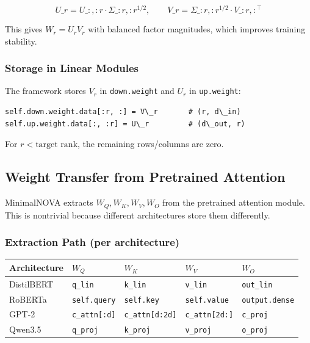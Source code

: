 \[
U\_r = U\_{:, :r} \cdot \Sigma\_{:r, :r}^{1/2}, \qquad
V\_r = \Sigma\_{:r, :r}^{1/2} \cdot V\_{:r, :}^\top
\tag{4.5}
\]

This gives $W_r = U_r V_r$ with balanced factor magnitudes, which improves 
training stability.

\subsubsection{Storage in Linear Modules}

The framework stores $V_r$ in \texttt{down.weight} and $U_r$ in \texttt{up.weight}:

\begin{lstlisting}
self.down.weight.data[:r, :] = V\_r       # (r, d\_in)
self.up.weight.data[:, :r] = U\_r         # (d\_out, r)
\end{lstlisting}

For $r < \text{target rank}$, the remaining rows/columns are zero.

\subsection{Weight Transfer from Pretrained Attention}

MinimalNOVA extracts $W_Q, W_K, W_V, W_O$ from the pretrained attention 
module. This is nontrivial because different architectures store them 
differently.

\subsubsection{Extraction Path (per architecture)}

\begin{table}[H]
\centering
\small
\begin{tabular}{lllll}
\toprule
\textbf{Architecture} & \textbf{$W_Q$} & \textbf{$W_K$} & \textbf{$W_V$} & \textbf{$W_O$} \\
\midrule
DistilBERT & \texttt{q\_lin} & \texttt{k\_lin} & \texttt{v\_lin} & \texttt{out\_lin} \\
RoBERTa & \texttt{self.query} & \texttt{self.key} & \texttt{self.value} & \texttt{output.dense} \\
GPT-2 & \texttt{c\_attn[:d]} & \texttt{c\_attn[d:2d]} & \texttt{c\_attn[2d:]} & \texttt{c\_proj} \\
Qwen3.5 & \texttt{q\_proj} & \texttt{k\_proj} & \texttt{v\_proj} & \texttt{o\_proj} \\
\bottomrule
\end{tabular}
\end{table}

